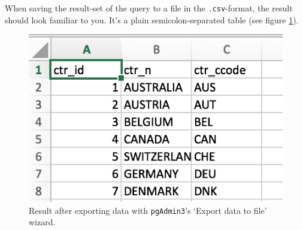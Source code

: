 When saving the result-set of the query to a file in the \texttt{.csv}-format, the result should look familiar to you. It's a plain semicolon-separated table (see figure \ref{fig_pgadmin3_sql_query_tool_export_data_result_example}).

\begin{figure}[ht!]
\centering
  \includegraphics[width=.6\textwidth,trim= 0 0 0 0, clip]{pcdb_documentation_screenshots/pgadmin3_sql_query_tool_export_data_result_example.png}
    \caption{Result after exporting data with \texttt{pgAdmin3}'s `Export data to file' wizard.}
    \label{fig_pgadmin3_sql_query_tool_export_data_result_example}
\end{figure}


